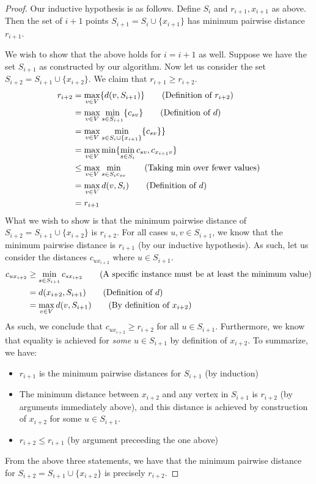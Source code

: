 \documentclass[12pt]{exam}
\begin{document}
\begin{questions}
\begin{solution}
\begin{enumerate}[label=(\alph*)]
\begin{proof}
      Our inductive hypothesis is as follows.
      Define $S_i$ and $r_{i+1}, x_{i+1}$ as above. Then the set of $i + 1$ points $S_{i+1} = S_i \cup \{x_{i+1}\}$ has minimum pairwise distance $r_{i+1}$.

      We wish to show that the above holds for $i = i + 1$ as well. Suppose we have the set $S_{i+1}$ as constructed by our algorithm. Now let us consider the set $S_{i+2} = S_{i+1} \cup \{ x_{i+2} \}$. We claim that $r_{i+1} \geq r_{i+2}$. 
      \begin{align*}
        r_{i+2} &= \max_{v \in V} \{ d(v, S_{i+1})  \} \tag{Definition of $r_{i+2}$} \\
        &= \max_{v \in V} \min_{s \in S_{i+1}} \{c_{sv}\} \tag{Definition of $d$} \\
        &= \max_{v \in V} \min_{s \in S_{i} \cup \{x_{i+1}\}} \{c_{sv}\} \} \\
        &= \max_{v \in V} \min \{ \min_{s \in S_i} c_{sv}, c_{x_{i+1}v} \} \\
        &\leq \max_{v \in V} \min_{s \in S_i c_{sv}} \tag{Taking min over fewer values} \\
        &= \max_{v \in V} d(v, S_{i}) \tag{Definition of $d$} \\
        &= r_{i+1}
      \end{align*}
      What we wish to show is that the minimum pairwise distance of $S_{i+2} = S_{i+1} \cup \{x_{i+2}\}$ is $r_{i+2}$. For all cases $u,v \in S_{i +1}$, we know that the minimum pairwise distance is $r_{i+1}$ (by our inductive hypothesis). As such, let us consider the distances $c_{ux_{i+2}}$ where $u \in S_{i+1}$.
      \begin{align*}
        c_{ux_{i+2}} &\geq \min_{s \in S_{i+1}} c_{sx_{i+2}} \tag{A specific instance must be at least the minimum value} \\
        &= d(x_{i+2}, S_{i+1}) \tag{Definition of $d$} \\
        &= \max_{v \in V} d(v, S_{i+1}) \tag{By definition of $x_{i+2}$}
      \end{align*}
      As such, we conclude that $c_{ux_{i+2}} \geq r_{i+2}$ for all $u \in S_{i+1}$. Furthermore, we know that equality is achieved for \textit{some} $u \in S_{i+1}$ by definition of $x_{i+2}$. To summarize, we have:
      \begin{itemize}
        \item $r_{i+1}$ is the minimum pairwise distances for $S_{i+1}$ (by induction)
        \item The minimum distance between $x_{i+2}$ and any vertex in $S_{i+1}$ is $r_{i+2}$ (by arguments immediately above), and this distance is achieved by construction of $x_{i+2}$ for some $u \in S_{i+1}$.
        \item $r_{i+2} \leq r_{i+1}$ (by argument preceeding the one above)
      \end{itemize}
      From the above three statements, we have that the minimum pairwise distance for $S_{i+2} = S_{i+1} \cup \{x_{i+2}\}$ is precisely $r_{i+2}$. 
    \end{proof}


\end{enumerate}
\end{solution}
\end{questions}
\end{document}

